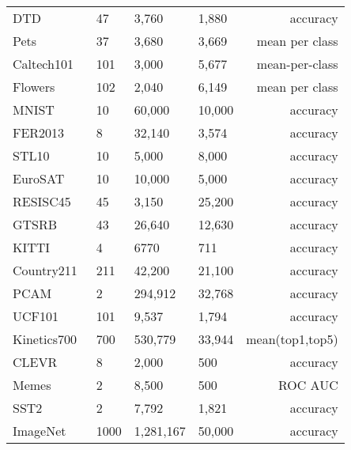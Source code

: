 \begin{table}[t!]
{\begin{tabular}{llllr}
            DTD~\cite{cimpoi2014describing} & 47 & 3,760 & 1,880 & accuracy\\
            Pets~\cite{parkhi2012cats} & 37 & 3,680 & 3,669 & mean per class\\
            Caltech101~\cite{fei2004learning} & 101 & 3,000 & 5,677 & mean-per-class\\
            Flowers~\cite{nilsback2008automated} & 102 & 2,040 & 6,149 & mean per class\\
            MNIST~\cite{lecun1998gradient} & 10 & 60,000 & 10,000 & accuracy\\
            FER2013~\cite{KrauseStarkDengFei-Fei_3DRR2013} & 8 & 32,140 & 3,574 & accuracy\\
            STL10~\cite{coates2011analysis} & 10 & 5,000 & 8,000 & accuracy\\
            EuroSAT~\cite{helber2019eurosat} & 10 & 10,000 & 5,000 & accuracy\\
            RESISC45~\cite{cheng2017remote} & 45 & 3,150 & 25,200 & accuracy\\
            GTSRB~\cite{stallkamp2012man} & 43 & 26,640 & 12,630 & accuracy\\
            KITTI~\cite{geiger2012we} & 4 & 6770 & 711 & accuracy\\
            Country211~\cite{radford2021learning} & 211 & 42,200 & 21,100 & accuracy\\
            PCAM~\cite{veeling2018rotation} & 2 & 294,912 & 32,768 & accuracy\\
            UCF101~\cite{soomro2012ucf101} & 101 & 9,537 & 1,794 & accuracy\\
            Kinetics700~\cite{carreira2019short} & 700 & 530,779 & 33,944 & mean(top1,top5)\\
            CLEVR~\cite{johnson2017clevr} & 8 & 2,000 & 500 & accuracy\\
            Memes~\cite{kiela2020hateful} & 2 & 8,500 & 500 & ROC AUC\\
            SST2~\cite{radford2021learning} & 2 & 7,792 & 1,821 & accuracy\\
            ImageNet~\cite{deng2009imagenet} & 1000 & 1,281,167 & 50,000 & accuracy\\
            \bottomrule
        \end{tabular}}
\end{table}

